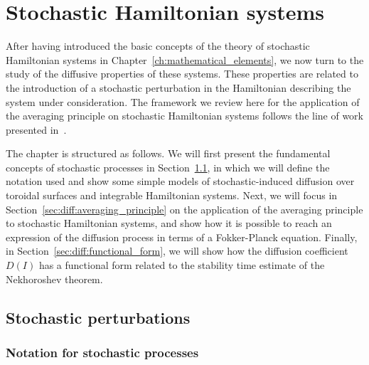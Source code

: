 
\chapter{Stochastic Hamiltonian systems}\label{ch:the_diffusive_framework}

After having introduced the basic concepts of the theory of stochastic Hamiltonian systems in Chapter~\ref{ch:mathematical_elements}, we now turn to the study of the diffusive properties of these systems. These properties are related to the introduction of a stochastic perturbation in the Hamiltonian describing the system under consideration. The framework we review here for the application of the averaging principle on stochastic Hamiltonian systems follows the line of work presented in~\cite{Bazzani9948, Bazzani:2019lse, bazzani2020diffusion}.

The chapter is structured as follows. We will first present the fundamental concepts of stochastic processes in Section~\ref{sec:diff:stochastic_perturbations}, in which we will define the notation used and show some simple models of stochastic-induced diffusion over toroidal surfaces and integrable Hamiltonian systems. Next, we will focus in Section~\ref{sec:diff:averaging_principle} on the application of the averaging principle to stochastic Hamiltonian systems, and show how it is possible to reach an expression of the diffusion process in terms of a Fokker-Planck equation. Finally, in Section~\ref{sec:diff:functional_form}, we will show how the diffusion coefficient $D(I)$ has a functional form related to the stability time estimate of the Nekhoroshev theorem.

\section{Stochastic perturbations}
\label{sec:diff:stochastic_perturbations}

\subsection{Notation for stochastic processes}
\label{subsec:Diffusion for a stochastically perturbed integrable system}

